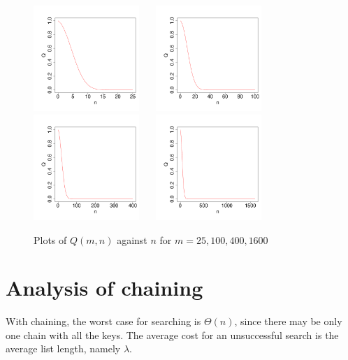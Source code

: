

\begin{figure}[htb]
\centering
\includegraphics[width=4cm]{figs/birthday25.pdf}
$\quad$
\includegraphics[width=4cm]{figs/birthday100.pdf}\\
\includegraphics[width=4cm]{figs/birthday400.pdf}
$\quad$
\includegraphics[width=4cm]{figs/birthday1600.pdf}
\caption{Plots of $Q(m, n)$ against $n$ for $m=25,100,400,1600$}

\end{figure}

\section{Analysis of chaining}
With chaining, the worst case for searching is $\Theta(n)$, since there may be only one chain with all the keys. 
The average cost for an unsuccessful search is the average list length, namely $\lambda$.


